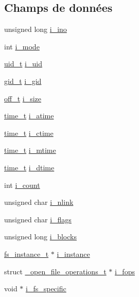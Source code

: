 \subsection*{Champs de données}
\begin{DoxyCompactItemize}
\item 
unsigned long \hyperlink{struct__inode__t_aba602b843ba63a32ca3950dbaf7e959c}{i\+\_\+ino}
\item 
int \hyperlink{struct__inode__t_acead4732b6c22ef17ada59203509e728}{i\+\_\+mode}
\item 
\hyperlink{kstat_8h_af2306308627701b66dc6f3babe821ab4}{uid\+\_\+t} \hyperlink{struct__inode__t_a7ddcb65050ac0b4c9cfbacd495d56f4b}{i\+\_\+uid}
\item 
\hyperlink{kstat_8h_aa7352f1065fe606194d792e2b292cf83}{gid\+\_\+t} \hyperlink{struct__inode__t_a95d052a6e9b1b1e4f6837fa0f33b393e}{i\+\_\+gid}
\item 
\hyperlink{libc_2include_2sys_2types_8h_a447a6a64dbb8fb44b1e62856b333db4a}{off\+\_\+t} \hyperlink{struct__inode__t_aed37b31c96c90873201abfc8b4b3e463}{i\+\_\+size}
\item 
\hyperlink{time_8h_aaaf414ca0598a3633e6e9161cbb5a58a}{time\+\_\+t} \hyperlink{struct__inode__t_a01f50c6c44a3b50e4414a794643b741f}{i\+\_\+atime}
\item 
\hyperlink{time_8h_aaaf414ca0598a3633e6e9161cbb5a58a}{time\+\_\+t} \hyperlink{struct__inode__t_a73ee1e604547b74b8e1045fd4f6699b6}{i\+\_\+ctime}
\item 
\hyperlink{time_8h_aaaf414ca0598a3633e6e9161cbb5a58a}{time\+\_\+t} \hyperlink{struct__inode__t_a331d724391efce2f89aeb1a503ae5c43}{i\+\_\+mtime}
\item 
\hyperlink{time_8h_aaaf414ca0598a3633e6e9161cbb5a58a}{time\+\_\+t} \hyperlink{struct__inode__t_a393de4c58241168fdf397ab8421a3539}{i\+\_\+dtime}
\item 
int \hyperlink{struct__inode__t_a8ea768d56d01e010bc0c809bc38dbb28}{i\+\_\+count}
\item 
unsigned char \hyperlink{struct__inode__t_a929fc1e6837d02a2525027a121b4e67e}{i\+\_\+nlink}
\item 
unsigned char \hyperlink{struct__inode__t_a36ff48a57a9e483d74682972d31ef46c}{i\+\_\+flags}
\item 
unsigned long \hyperlink{struct__inode__t_a92ebe4c1e93af9fba4efae4d07e14858}{i\+\_\+blocks}
\item 
\hyperlink{vfs_8h_a0eefa9aac35a5462ebf1e038992ca860}{fs\+\_\+instance\+\_\+t} $\ast$ \hyperlink{struct__inode__t_affefc88b22f45e2ec8340d582486d0f2}{i\+\_\+instance}
\item 
struct \hyperlink{struct__open__file__operations__t}{\+\_\+open\+\_\+file\+\_\+operations\+\_\+t} $\ast$ \hyperlink{struct__inode__t_acf149d7d1601f78142b1eec480badf7e}{i\+\_\+fops}
\item 
void $\ast$ \hyperlink{struct__inode__t_a54e34439c448c46bae90fd040dadc5c0}{i\+\_\+fs\+\_\+specific}
\end{DoxyCompactItemize}


